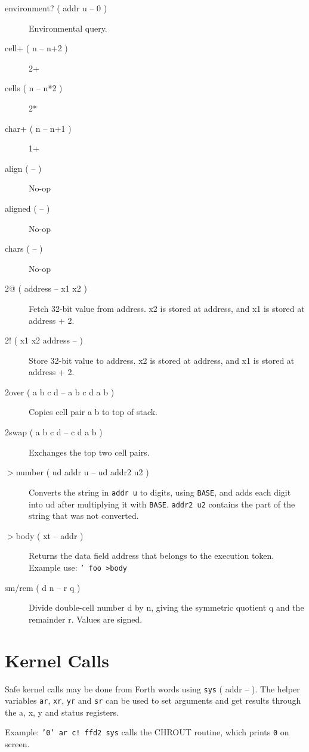 \begin{description}
    \item[environment? ( addr u -- 0 )] Environmental query.
    \item[cell+ ( n -- n+2 )] 2+
    \item[cells ( n -- n*2 )] 2*
    \item[char+ ( n -- n+1 )] 1+
    \item[align ( -- )] No-op
    \item[aligned ( -- )] No-op
    \item[chars ( -- )] No-op
    \item[2@ ( address -- x1 x2 )] Fetch 32-bit value from address. x2 is stored at address, and x1 is stored at address + 2.
    \item[2! ( x1 x2 address -- )] Store 32-bit value to address. x2 is stored at address, and x1 is stored at address + 2.
    \item[2over ( a b c d -- a b c d a b )] Copies cell pair a b to top of stack.
    \item[2swap ( a b c d -- c d a b )] Exchanges the top two cell pairs.
    \item[$>$number ( ud addr u -- ud addr2 u2 )] Converts the string in \texttt{addr u} to digits, using \texttt{BASE}, and adds each digit into ud after multiplying it with \texttt{BASE}. \texttt{addr2 u2} contains the part of the string that was not converted.
    \item[$>$body ( xt -- addr )] Returns the data field address that belongs to the execution token. Example use: \texttt{' foo >body}
    \item[sm/rem ( d n -- r q )] Divide double-cell number d by n, giving the symmetric quotient q and the remainder r. Values are signed.

\end{description}

\section{Kernel Calls}

Safe kernel calls may be done from Forth words using \texttt{sys} ( addr -- ). The helper variables \texttt{ar}, \texttt{xr}, \texttt{yr} and \texttt{sr} can be used to set arguments and get results through the a, x, y and status registers.

Example: \texttt{'0' ar c! ffd2 sys} calls the CHROUT routine, which prints \texttt{0} on screen.
